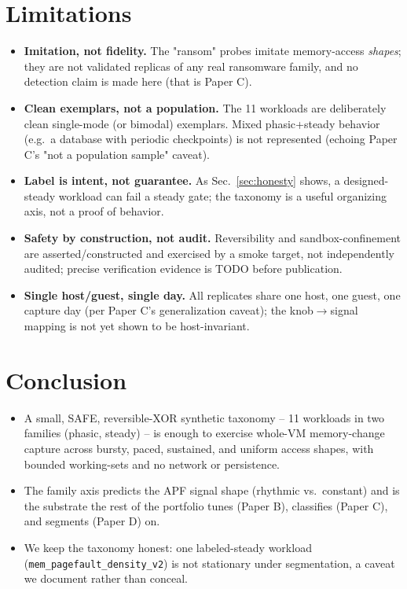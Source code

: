 \documentclass[conference]{IEEEtran}
\begin{document}
\section{Limitations}
\begin{itemize}
  \item \textbf{Imitation, not fidelity.} The "ransom" probes imitate
        memory-access \emph{shapes}; they are not validated replicas of any real
        ransomware family, and no detection claim is made here (that is
        Paper C). \cite{TODO_ransomware_survey}
  \item \textbf{Clean exemplars, not a population.} The 11 workloads are
        deliberately clean single-mode (or bimodal) exemplars. Mixed
        phasic+steady behavior (e.g.\ a database with periodic checkpoints) is
        not represented (echoing Paper C's "not a population sample" caveat).
  \item \textbf{Label is intent, not guarantee.} As Sec.~\ref{sec:honesty}
        shows, a designed-steady workload can fail a steady gate; the taxonomy
        is a useful organizing axis, not a proof of behavior.
  \item \textbf{Safety by construction, not audit.} Reversibility and
        sandbox-confinement are asserted/constructed and exercised by a smoke
        target, not independently audited; precise verification evidence is
        TODO before publication.
  \item \textbf{Single host/guest, single day.} All replicates share one host,
        one guest, one capture day (per Paper C's generalization caveat); the
        knob$\to$signal mapping is not yet shown to be host-invariant.
\end{itemize}

\section{Conclusion}
\begin{itemize}
  \item A small, SAFE, reversible-XOR synthetic taxonomy -- 11 workloads in two
        families (phasic, steady) -- is enough to exercise whole-VM
        memory-change capture across bursty, paced, sustained, and uniform
        access shapes, with bounded working-sets and no network or persistence.
  \item The family axis predicts the APF signal shape (rhythmic vs.\ constant)
        and is the substrate the rest of the portfolio tunes (Paper B),
        classifies (Paper C), and segments (Paper D) on.
  \item We keep the taxonomy honest: one labeled-steady workload
        (\texttt{mem\_pagefault\_density\_v2}) is not stationary under
        segmentation, a caveat we document rather than conceal.
\end{itemize}



\end{document}
